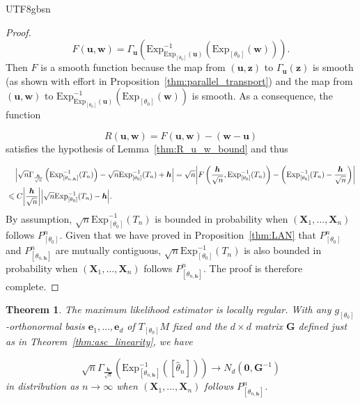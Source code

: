\documentclass[12pt]{report}
\newcommand\tab[1][1cm]{\hspace*{#1}}
\newcommand{\bracket}[1]{\left ( #1 \right )}
\newcommand{\squared}[1]{\left [ #1 \right ]}
\theoremstyle{plain}
\newtheorem{theorem}{Theorem}
\theoremstyle{definition}
\begin{document}
\begin{CJK*}{UTF8}{gbsn}
\begin{proof}
\begin{equation*}
  F(\bm{u}, \bm{w}) = \Gamma_{\bm{u}}
  \bracket{\text{Exp}^{-1}_{\text{Exp}_{[\theta_0]}(\bm{u})}
  \bracket{\text{Exp}_{[\theta_0]}(\bm{w})}}.
\end{equation*}
Then $F$ is a smooth function because 
the map from $(\bm{u}, \bm{z})$
to $\Gamma_{\bm{u}}(\bm{z})$ is smooth (as shown with effort in Proposition~\ref{thm:parallel_transport})
and the map from $(\bm{u}, \bm{w})$
to $\text{Exp}^{-1}_{\text{Exp}_{[\theta_0]}(\bm{u})}
  \bracket{\text{Exp}_{[\theta_0]}(\bm{w})}$
is smooth.
As a consequence,
the function 

\begin{equation*}
  R(\bm{u}, \bm{w}) = F(\bm{u}, \bm{w}) - (\bm{w}-\bm{u})
\end{equation*}
satisfies the hypothesis of Lemma~\ref{thm:R_u_w_bound}
and thus 

\begin{equation*}
  \begin{split}
  & \tab[0.4cm]  \abs{\sqrt{n} \Gamma_{\frac{\bm{h}}{\sqrt{n}}}
  \bracket{\text{Exp}^{-1}_{\squared{\theta_{n,\bm{h}}}}(T_n)}
  - \sqrt{n} \text{Exp}_{[\theta_0]}^{-1}(T_n) 
  + \bm{h}} =
  \sqrt{n}\abs{F \bracket{\frac{\bm{h}}{\sqrt{n}}, \text{Exp}^{-1}_{[\theta_0]}(T_n)} - 
  \bracket{\text{Exp}^{-1}_{[\theta_0]}(T_n)-\frac{\bm{h}}{\sqrt{n}}}}
  \\ & \leqslant C \abs{\frac{\bm{h}}{\sqrt{n}}}
  \abs{\sqrt{n}\text{Exp}^{-1}_{[\theta_0]}(T_n)-\bm{h}}.
  \end{split}
\end{equation*}
By assumption, $\sqrt{n}\text{Exp}^{-1}_{[\theta_0]}(T_n)$
is bounded in probability 
when $(\bm{X}_1, \ldots, \bm{X}_n)$ follows $P^n_{[\theta_0]}$.
Given that we have proved in Proposition~\ref{thm:LAN}
that $P^n_{[\theta_0]}$ and $P^n_{\squared{\theta_{n,\bm{h}}}}$ are mutually 
contiguous, $\sqrt{n}\text{Exp}^{-1}_{[\theta_0]}(T_n)$ is also 
bounded in probability when $(\bm{X}_1, \ldots, \bm{X}_n)$ follows 
$P^n_{\squared{\theta_{n,\bm{h}}}}$.
The proof is therefore complete.
\end{proof}

\begin{theorem}
The maximum likelihood estimator is locally regular.
With
any $g_{[\theta_0]}$-orthonormal basis 
$\bm{e}_1, \ldots, \bm{e}_d$ of $T_{[\theta_0]}M$ fixed
and the $d \times d$ matrix $\bm{G}$ defined just as in Theorem~\ref{thm:asc_linearity},
we have

\begin{equation*}
  \sqrt{n} \Gamma_{\frac{\bm{h}}{\sqrt{n}}} \bracket{\text{Exp}^{-1}_{
    \squared{\theta_{n, \bm{h}}}}\bracket{\squared{\hat{\theta}_n}}}
    \to N_d \bracket{\bm{0}, \bm{G}^{-1}}
\end{equation*}
in distribution 
as $n \to \infty$ when $(\bm{X}_1, \ldots, \bm{X}_n)$ 
follows $P^n_{\squared{\theta_{n,\bm{h}}}}$.
\end{theorem}


\end{CJK*}
\end{document}

